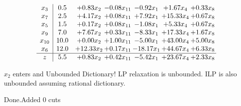 \documentclass[8pt]{article}
\begin{document}
 \[\begin{array}{c| c c@{\hskip 2pt} c@{\hskip 2pt} c@{\hskip 2pt} c@{\hskip 2pt} c@{\hskip 2pt} }
 x_{3}   &  0.5 & +  0.83 x_{2} & -0.08 x_{11} & -0.92 x_{1} & +  1.67 x_{4} & +  0.33 x_{8}\\
 x_{7}   &  2.5 & +  4.17 x_{2} & +  0.08 x_{11} & +  7.92 x_{1} & + 15.33 x_{4} & +  0.67 x_{8}\\
 x_{5}   &  1.5 & +  0.17 x_{2} & +  0.08 x_{11} & -1.08 x_{1} & +  5.33 x_{4} & +  0.67 x_{8}\\
 x_{9}   &  7.0 & +  7.67 x_{2} & +  0.33 x_{11} & -8.33 x_{1} & + 17.33 x_{4} & +  1.67 x_{8}\\
 x_{10}   &  10.0 & +  0.00 x_{2} & +  1.00 x_{11} & -5.00 x_{1} & + 43.00 x_{4} & +  5.00 x_{8}\\
 x_{6}   &  12.0 & + 12.33 x_{2} & +  0.17 x_{11} & -18.17 x_{1} & + 44.67 x_{4} & +  6.33 x_{8}\\
\hline
z    &  5.5 & +  0.83 x_{2} & +  0.42 x_{11} & -5.42 x_{1} & + 23.67 x_{4} & +  2.33 x_{8}\\
\end{array}\]


 $ x_{2} $ enters and Unbounded Dictionary!
 LP relaxation is unbounded. ILP is also unbounded assuming rational dictionary. 

Done.Added 0 cuts 
\end{document}
